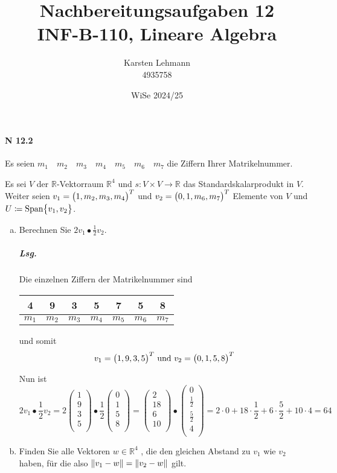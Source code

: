 \documentclass{scrreprt}
\author{Karsten Lehmann \\ 4935758}
\date{WiSe 2024/25}
\title{Nachbereitungsaufgaben 12\\INF-B-110, Lineare Algebra}
\begin{document}
\paragraph{N 12.2} Es seien
$m_1 \quad m_2 \quad m_3 \quad m_4 \quad m_5 \quad m_6 \quad m_7$ die Ziffern
Ihrer Matrikelnummer.

Es sei $V$ der $\mathbb{R}$-Vektorraum $\mathbb{R}^4$ und
$s \colon V \times V \to \mathbb{R}$ das Standardskalarprodukt in $V$.
Weiter seien $v_1 = \qty\big(1, m_2, m_3, m_4)^T$ und
$v_2 = \qty\big(0, 1, m_6, m_7)^T$ Elemente von $V$ und
$U \coloneqq \text{Span}\qty\big{v_1, v_2}$.
\begin{enumerate}[(a)]
\item Berechnen Sie $2v_1 \bullet \frac{1}{2}v_2$.

  \subparagraph{Lsg.} Die einzelnen Ziffern der Matrikelnummer sind

  \begin{tabular}{|c|c|c|c|c|c|c|}
    \hline
    4 & 9 & 3 & 5 & 7 & 5 & 8 \\
    \hline
    $m_1$ & $m_2$ & $m_3$ & $m_4$ & $m_5$ & $m_6$ & $m_7$ \\
    \hline
  \end{tabular}

  und somit
  \[
    v_1 = \qty\big(1, 9, 3, 5)^T \text{ und }
    v_2 = \qty\big(0, 1, 5, 8)^T
  \]

  Nun ist
  \[
    2v_1 \bullet \frac{1}{2}v_2
    = 2\begin{pmatrix}
      1 \\
      9 \\
      3 \\
      5 \\
    \end{pmatrix} \bullet \frac{1}{2} \begin{pmatrix}
      0 \\
      1 \\
      5 \\
      8 \\
    \end{pmatrix}
    = \begin{pmatrix}
      2  \\
      18 \\
      6  \\
      10 \\
    \end{pmatrix} \bullet \begin{pmatrix}
      0           \\
      \frac{1}{2} \\
      \frac{5}{2} \\
      4           \\
    \end{pmatrix}
    = 2 \cdot 0 + 18 \cdot \frac{1}{2} + 6 \cdot \frac{5}{2} + 10 \cdot 4
    = 64
  \]
\item Finden Sie alle Vektoren $w \in \mathbb{R}^4$ , die den gleichen
  Abstand zu $v_1$ wie $v_2$ haben, für die also
  $\norm{v_1 - w} = \norm{v_2 - w}$ gilt.


\end{enumerate}
\end{document}
